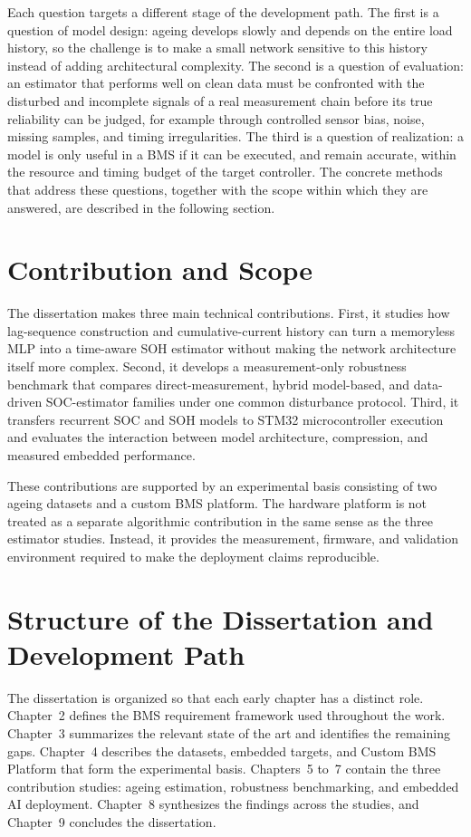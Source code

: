 \documentclass[
    a4paper,
    12pt,
    titlepage,
    bibliography=totoc,
    twoside=on,
    parskip=false,
    numbers=noenddot,
    cleardoublepage=empty,
    DIV=12,
    BCOR=12.0mm,
    headheight=36pt,
    headings=openright
]{scrreprt}
\begin{document}
Each question targets a different stage of the development path. The first is a question of model design: ageing develops slowly and depends on the entire load history, so the challenge is to make a small network sensitive to this history instead of adding architectural complexity. The second is a question of evaluation: an estimator that performs well on clean data must be confronted with the disturbed and incomplete signals of a real measurement chain before its true reliability can be judged, for example through controlled sensor bias, noise, missing samples, and timing irregularities. The third is a question of realization: a model is only useful in a BMS if it can be executed, and remain accurate, within the resource and timing budget of the target controller. The concrete methods that address these questions, together with the scope within which they are answered, are described in the following section.

\section{Contribution and Scope}
The dissertation makes three main technical contributions. First, it studies how lag-sequence construction and cumulative-current history can turn a memoryless MLP into a time-aware SOH estimator without making the network architecture itself more complex. Second, it develops a measurement-only robustness benchmark that compares direct-measurement, hybrid model-based, and data-driven SOC-estimator families under one common disturbance protocol. Third, it transfers recurrent SOC and SOH models to STM32 microcontroller execution and evaluates the interaction between model architecture, compression, and measured embedded performance.

These contributions are supported by an experimental basis consisting of two ageing datasets and a custom BMS platform. The hardware platform is not treated as a separate algorithmic contribution in the same sense as the three estimator studies. Instead, it provides the measurement, firmware, and validation environment required to make the deployment claims reproducible.

\section{Structure of the Dissertation and Development Path}
The dissertation is organized so that each early chapter has a distinct role. Chapter~2 defines the BMS requirement framework used throughout the work. Chapter~3 summarizes the relevant state of the art and identifies the remaining gaps. Chapter~4 describes the datasets, embedded targets, and Custom BMS Platform that form the experimental basis. Chapters~5 to~7 contain the three contribution studies: ageing estimation, robustness benchmarking, and embedded AI deployment. Chapter~8 synthesizes the findings across the studies, and Chapter~9 concludes the dissertation.
\end{document}
